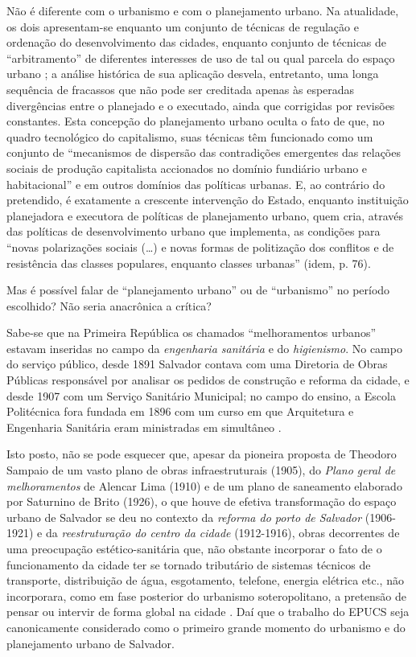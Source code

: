 Não é diferente com o urbanismo e com o planejamento urbano. Na atualidade, os dois apresentam-se enquanto um conjunto de técnicas de regulação e ordenação do desenvolvimento das cidades, enquanto conjunto de técnicas de ``arbitramento'' de diferentes interesses de uso de tal ou qual parcela do espaço urbano \cite{bernardi_organizacao_2007, duarte_planejamento_2007}; a análise histórica de sua aplicação desvela, entretanto, uma longa sequência de fracassos \cite{hall_cidades_2007, SANTOS1982} que não pode ser creditada apenas às esperadas divergências entre o planejado e o executado, ainda que corrigidas por revisões constantes. Esta concepção do planejamento urbano oculta o fato de que, no quadro tecnológico do capitalismo, suas técnicas têm funcionado como um conjunto de ``mecanismos de dispersão das contradições emergentes das relações sociais de produção capitalista accionados no domínio fundiário urbano e habitacional'' \cite[p~76]{SANTOS1982} e em outros domínios das políticas urbanas. E, ao contrário do pretendido, é exatamente a crescente intervenção do Estado, enquanto instituição planejadora e executora de políticas de planejamento urbano, quem cria, através das políticas de desenvolvimento urbano que implementa, as condições para ``novas polarizações sociais (…) e novas formas de politização dos conflitos e de resistência das classes populares, enquanto classes urbanas'' (idem, p. 76).

Mas é possível falar de ``planejamento urbano'' ou de ``urbanismo'' no período escolhido? Não seria anacrônica a crítica?

Sabe-se que na Primeira República os chamados ``melhoramentos urbanos'' estavam inseridas no campo da \textit{engenharia sanitária} e do \textit{higienismo}. No campo do serviço público, desde 1891 Salvador contava com uma Diretoria de Obras Públicas responsável por analisar os pedidos de construção e reforma da cidade, e desde 1907 com um Serviço Sanitário Municipal; no campo do ensino, a Escola Politécnica fora fundada em 1896 com um curso em que Arquitetura e Engenharia Sanitária eram ministradas em simultâneo \cite{fernandessampaiogomes1999}. 

Isto posto, não se pode esquecer que, apesar da pioneira proposta de Theodoro Sampaio de um vasto plano de obras infraestruturais (1905), do \textit{Plano geral de melhoramentos} de Alencar Lima (1910) e de um plano de saneamento elaborado por Saturnino de Brito (1926), o que houve de efetiva transformação do espaço urbano de Salvador se deu no contexto da \textit{reforma do porto de Salvador} (1906-1921) e da \textit{reestruturação do centro da cidade} (1912-1916), obras decorrentes de uma preocupação estético-sanitária que, não obstante incorporar o fato de o funcionamento da cidade ter se tornado tributário de sistemas técnicos de transporte, distribuição de água, esgotamento, telefone, energia elétrica etc., não incorporara, como em fase posterior do urbanismo soteropolitano, a pretensão de pensar ou intervir de forma global na cidade \cite{fernandessampaiogomes1999}. Daí que o trabalho do EPUCS seja canonicamente considerado como o primeiro grande momento do urbanismo e do planejamento urbano de Salvador.

